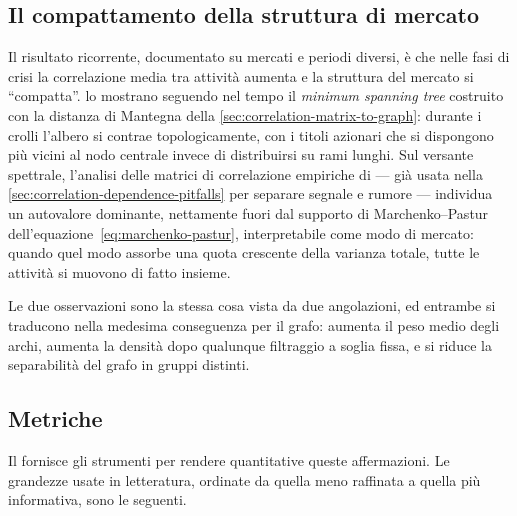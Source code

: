 \subsection{Il compattamento della struttura di mercato}

Il risultato ricorrente, documentato su mercati e periodi diversi, è che nelle fasi di crisi la correlazione media tra attività aumenta e la struttura del mercato si \enquote{compatta}. \Textcite{onnela2003dynamics} lo mostrano seguendo nel tempo il \emph{minimum spanning tree} costruito con la distanza di Mantegna della \cref{sec:correlation-matrix-to-graph}: durante i crolli l'albero si contrae topologicamente, con i titoli azionari che si dispongono più vicini al nodo centrale invece di distribuirsi su rami lunghi. Sul versante spettrale, l'analisi delle matrici di correlazione empiriche di \textcite{laloux1999noise} — già usata nella \cref{sec:correlation-dependence-pitfalls} per separare segnale e rumore — individua un autovalore dominante, nettamente fuori dal supporto di Marchenko--Pastur dell'equazione~\eqref{eq:marchenko-pastur}, interpretabile come modo di mercato: quando quel modo assorbe una quota crescente della varianza totale, tutte le attività si muovono di fatto insieme.

Le due osservazioni sono la stessa cosa vista da due angolazioni, ed entrambe si traducono nella medesima conseguenza per il grafo: aumenta il peso medio degli archi, aumenta la densità dopo qualunque filtraggio a soglia fissa, e si riduce la separabilità del grafo in gruppi distinti.

\subsection{Metriche}

Il  fornisce gli strumenti per rendere quantitative queste affermazioni. Le grandezze usate in letteratura, ordinate da quella meno raffinata a quella più informativa, sono le seguenti.

